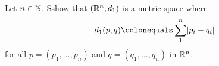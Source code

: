 \begin{problem}
  Let $n \in \mathbb{N}$. Sshow that $(\mathbb{R}^n, d_1)$ is a metric space
  where \[ d_1(p, q) \colonequals \sum_1^n \abs{p_i - q_i} \]
  for all $p = (p_1, \dots, p_n)$ and $q = (q_1, \dots, q_n)$ in $\mathbb{R}^n$.
\end{problem}
\begin{answer}

\end{answer}
